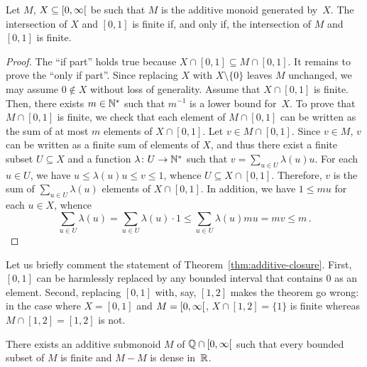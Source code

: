 
\begin{theorem} \label{thm:additive-closure}
  Let $M$, $X \subseteq \left[0, \infty\right[$ be such that $M$ is the additive monoid generated by~$X$.
  The intersection of $X$ and $[0, 1]$ is finite
  if, and only if,
  the intersection of $M$ and $[0, 1]$ is finite.
\end{theorem}

\begin{proof}
  The ``if part'' holds true because $X \cap [0, 1] \subseteq M \cap [0, 1]$. 
  It remains to prove the ``only if part''.
  Since replacing $X$ with $X \setminus \{ 0 \}$ leaves $M$ unchanged,
  we may assume $0 \notin X$ without loss of generality.
  Assume that $X \cap [0, 1]$ is finite.
  Then, there exists $m \in \mathbb{N}^*$ such that $m^{-1}$ is a lower bound for~$X$.
  To prove that $M \cap [0, 1]$ is finite,
  we check that each element of $M \cap [0, 1]$ can be written as the sum of at most $m$ elements of $X \cap [0, 1]$.
  Let $v \in M \cap [0, 1]$.
  Since $v \in M$, $v$ can be written as a finite sum of elements of $X$,
  and thus there exist
  a finite subset $U \subseteq X$ and
  a function $\lambda \colon U \to \mathbb{N}^*$ such that
  $v = \sum_{u \in U} \lambda(u) u$.
  For each $u \in U$, we have $u \le \lambda(u) u \le v \le 1$,
  whence $U \subseteq X \cap [0, 1]$.
  Therefore, $v$ is the sum of $\sum_{u \in U} \lambda(u)$ elements of $X \cap [0, 1]$.
  In addition, we have $1 \le m u$  for each $u \in X$, whence  
  $$
  \sum_{u \in U} \lambda(u) =
  \sum_{u \in U} \lambda(u) \cdot 1
  \le  \sum_{u \in U} \lambda(u) m u =  m v \le m \, . 
  $$
\end{proof}

Let us briefly comment the statement of Theorem~\ref{thm:additive-closure}.
First, $[0, 1]$ can be harmlessly replaced by any bounded interval that contains $0$ as an element.
Second, replacing $[0, 1]$ with, say, $[1, 2]$ makes the theorem go wrong:
in the case where $X = [0, 1]$ and $M = \left[0, \infty\right[$,
$X \cap [1, 2] = \{ 1 \}$ is finite whereas $M \cap [1, 2] = [1, 2]$ is not.

\begin{theorem} \label{thm:discrete-dense}
  There exists an additive submonoid $M$ of $\mathbb{Q} \cap \left[0, \infty\right[$ such that
  every bounded subset of $M$ is finite and
  $M - M$ is dense in~$\mathbb{R}$.
\end{theorem}

